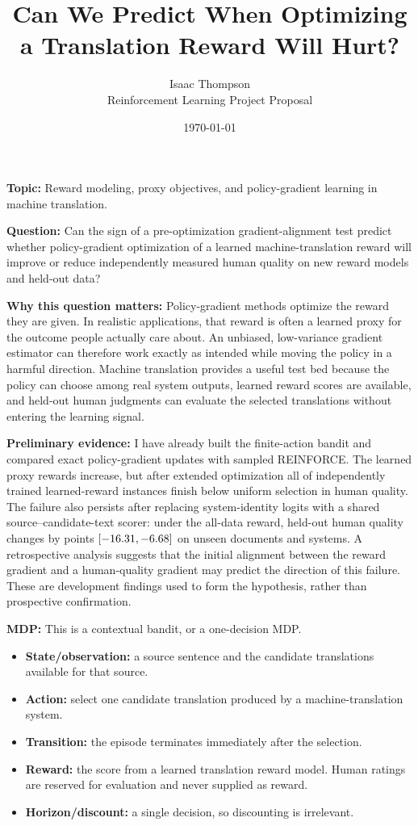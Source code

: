 \documentclass[11pt]{article}
\title{Can We Predict When Optimizing a Translation Reward Will Hurt?}
\author{Isaac Thompson\\Reinforcement Learning Project Proposal}
\date{\today}
\newcommand{\field}[1]{\vspace{0.25em}\textbf{#1}\quad}
\begin{document}
\maketitle
\vspace{-1.7em}

\field{Topic:}
Reward modeling, proxy objectives, and policy-gradient learning in machine
translation.

\field{Question:}
Can the sign of a pre-optimization gradient-alignment test predict whether
policy-gradient optimization of a learned machine-translation reward will
improve or reduce independently measured human quality on new reward models
and held-out data?

\field{Why this question matters:}
Policy-gradient methods optimize the reward they are given.  In realistic
applications, that reward is often a learned proxy for the outcome people
actually care about.  An unbiased, low-variance gradient estimator can
therefore work exactly as intended while moving the policy in a harmful
direction.  Machine translation provides a useful test bed because the policy
can choose among real system outputs, learned reward scores are available, and
held-out human judgments can evaluate the selected translations without
entering the learning signal.

\field{Preliminary evidence:}
I have already built the finite-action bandit and compared exact policy-gradient
updates with sampled REINFORCE.  The learned proxy rewards increase, but after
extended optimization all \SeedCellsBelowFinal{} of \SeedCells{} independently
trained learned-reward instances finish below uniform selection in human
quality.  The failure also persists after replacing system-identity logits
with a shared source--candidate-text scorer: under the all-data reward, held-out
human quality changes by \AllTextChange{} points
$[-16.31{},-6.68{}]$ on unseen documents and systems.  A
retrospective analysis suggests that the initial alignment between the reward
gradient and a human-quality gradient may predict the direction of this
failure.  These are development findings used to form the hypothesis, rather
than prospective confirmation.

\field{MDP:}
This is a contextual bandit, or a one-decision MDP.
\begin{itemize}
    \item \textbf{State/observation:} a source sentence and the candidate
    translations available for that source.
    \item \textbf{Action:} select one candidate translation produced by a
    machine-translation system.
    \item \textbf{Transition:} the episode terminates immediately after the
    selection.
    \item \textbf{Reward:} the score from a learned translation reward model.
    Human ratings are reserved for evaluation and never supplied as reward.
    \item \textbf{Horizon/discount:} a single decision, so discounting is
    irrelevant.
\end{itemize}
\end{document}
